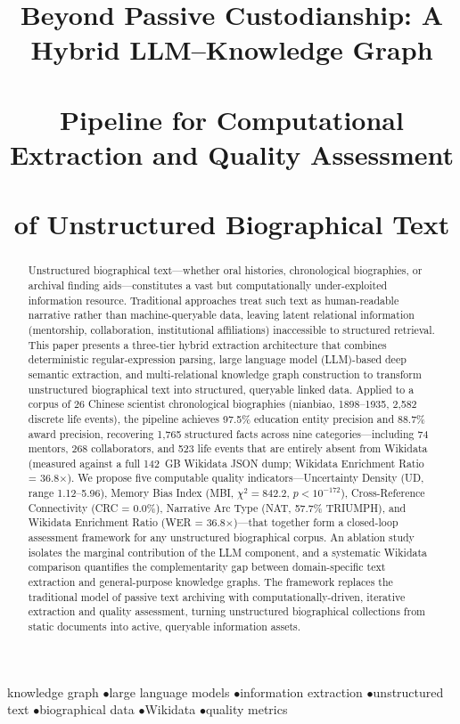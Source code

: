 \documentclass[review]{elsarticle}
\begin{document}
\begin{frontmatter}

\title{Beyond Passive Custodianship: A Hybrid LLM--Knowledge Graph\\\\
       Pipeline for Computational Extraction and Quality Assessment\\\\
       of Unstructured Biographical Text}

\begin{abstract}
Unstructured biographical text—whether oral histories, chronological biographies, or archival finding aids—constitutes a vast but computationally under-exploited information resource. Traditional approaches treat such text as human-readable narrative rather than machine-queryable data, leaving latent relational information (mentorship, collaboration, institutional affiliations) inaccessible to structured retrieval. This paper presents a three-tier hybrid extraction architecture that combines deterministic regular-expression parsing, large language model (LLM)-based deep semantic extraction, and multi-relational knowledge graph construction to transform unstructured biographical text into structured, queryable linked data. Applied to a corpus of 26 Chinese scientist chronological biographies (nianbiao, 1898--1935, 2,582 discrete life events), the pipeline achieves 97.5\% education entity precision and 88.7\% award precision, recovering 1,765 structured facts across nine categories—including 74 mentors, 268 collaborators, and 523 life events that are entirely absent from Wikidata (measured against a full 142~GB Wikidata JSON dump; Wikidata Enrichment Ratio = 36.8$\times$). We propose five computable quality indicators—Uncertainty Density (UD, range 1.12--5.96), Memory Bias Index (MBI, $\chi^2 = 842.2$, $p < 10^{-172}$), Cross-Reference Connectivity (CRC = 0.0\%), Narrative Arc Type (NAT, 57.7\% TRIUMPH), and Wikidata Enrichment Ratio (WER = 36.8$\times$)—that together form a closed-loop assessment framework for any unstructured biographical corpus. An ablation study isolates the marginal contribution of the LLM component, and a systematic Wikidata comparison quantifies the complementarity gap between domain-specific text extraction and general-purpose knowledge graphs. The framework replaces the traditional model of passive text archiving with computationally-driven, iterative extraction and quality assessment, turning unstructured biographical collections from static documents into active, queryable information assets.
\end{abstract}

\begin{keyword}
knowledge graph \enspace$\bullet$\enspace large language models \enspace$\bullet$\enspace information extraction \enspace$\bullet$\enspace unstructured text \enspace$\bullet$\enspace biographical data \enspace$\bullet$\enspace Wikidata \enspace$\bullet$\enspace quality metrics
\end{keyword}

\end{frontmatter}
\end{document}
